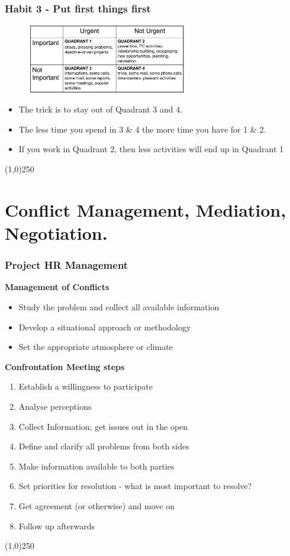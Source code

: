  
\begin{frame}
\frametitle{Habit 3 - Put first things first}
\begin{figure}
	\centering
		\includegraphics[width = 7cm]{images/habit3.jpg}
	\label{fig:covey}
\end{figure}
\begin{itemize}
	\item The trick is to stay out of Quadrant 3 and 4.
	\item The less time you spend in 3 \& 4 the more time you have for 1 \& 2.
	\item If you work in Quadrant 2, then less activities will end up in Quadrant 1
\end{itemize}
\end{frame}\begin{center}\line(1,0){250}\end{center}
 
\section{Conflict Management, Mediation, Negotiation.}
 
\begin{frame}
\frametitle{Project HR Management}
\textbf{Management of Conflicts}
\begin{itemize}
	\item Study the problem and collect all available information
	\item Develop a situational approach or methodology
	\item Set the appropriate atmosphere or climate
\end{itemize}
\textbf{Confrontation Meeting steps}
\begin{enumerate}
	\item Establish a willingness to participate
	\item Analyse perceptions
	\item Collect Information; get issues out in the open
	\item Define and clarify all problems from both sides
	\item Make information available to both parties
	\item Set priorities for resolution - what is most important to resolve?
	\item Get agreement (or otherwise) and move on
	\item Follow up afterwards
\end{enumerate}
\end{frame}\begin{center}\line(1,0){250}\end{center}
 
